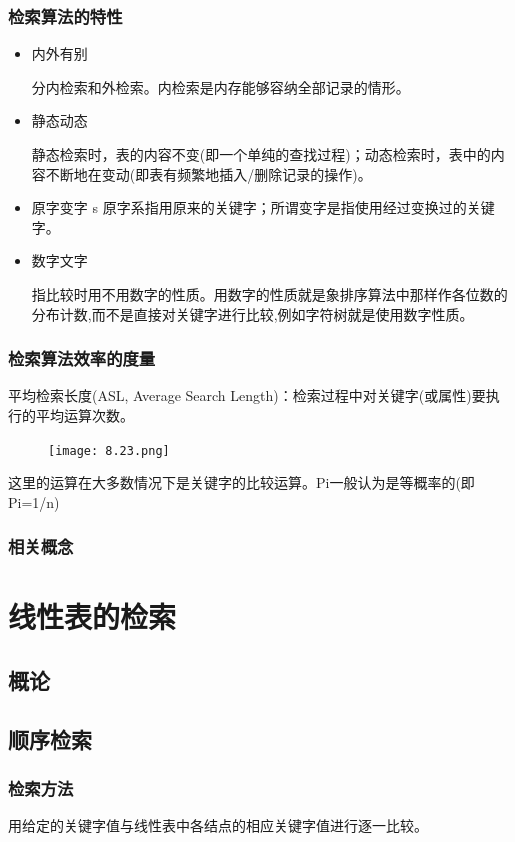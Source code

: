 \documentclass[AutoFakeBold]{LZUThesis2007}
\begin{document}
			\subsubsection{检索算法的特性}
\begin{itemize}
	\item 内外有别

分内检索和外检索。内检索是内存能够容纳全部记录的情形。 
	\item 静态动态

      静态检索时，表的内容不变(即一个单纯的查找过程)；动态检索时，表中的内容不断地在变动(即表有频繁地插入/删除记录的操作)。
	\item 原字变字
s
      原字系指用原来的关键字；所谓变字是指使用经过变换过的关键字。

	\item 数字文字

       指比较时用不用数字的性质。用数字的性质就是象排序算法中那样作各位数的分布计数,而不是直接对关键字进行比较,例如字符树就是使用数字性质。

\end{itemize}

			\subsubsection{检索算法效率的度量}
平均检索长度(ASL, Average Search Length)：检索过程中对关键字(或属性)要执行的平均运算次数。
\begin{figure}[H]
    \centering
    \texttt{[image: 8.23.png]}

\end{figure}
这里的运算在大多数情况下是关键字的比较运算。Pi一般认为是等概率的(即Pi=1/n)
			\subsubsection{相关概念}
	\section{线性表的检索}
		\subsection{概论}
		\subsection{顺序检索}

			\subsubsection{检索方法}
用给定的关键字值与线性表中各结点的相应关键字值进行逐一比较。
\end{document}
